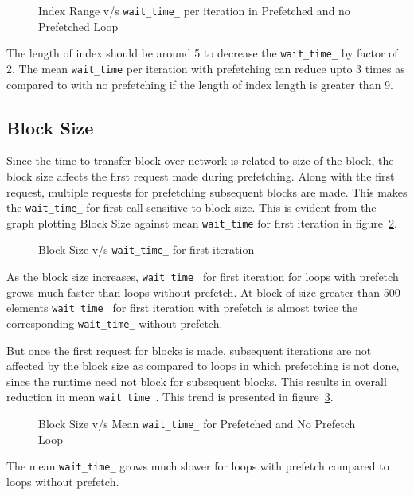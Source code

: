 \begin{figure}[h]
  
  \caption{Index Range v/s \texttt{wait\_time\_} per iteration in Prefetched and no Prefetched Loop}
  \label{fig:p_np_mean}
\end{figure}

The length of index should be around 5 to decrease the \texttt{wait\_time\_}
by factor of 2. The mean \texttt{wait\_time} per iteration with prefetching can
reduce upto 3 times as compared to with no prefetching if the length of index
length is greater than 9.

\subsection{Block Size}
Since the time to transfer block over network is related to size of the block, the
block size affects the first request made during prefetching. Along with the first
request, multiple requests for prefetching subsequent blocks are made. This makes
the \texttt{wait\_time\_} for first call sensitive to block size. This is evident
from the graph plotting Block Size against mean \texttt{wait\_time} for first
iteration in figure~\ref{fig:first_wait_time}.
\begin{figure}[h]
  
  \caption{Block Size v/s \texttt{wait\_time\_} for first iteration}
  \label{fig:first_wait_time}
\end{figure}

As the block size increases, \texttt{wait\_time\_} for first iteration for loops
with prefetch grows much faster than loops without prefetch. At block of size
greater than 500 elements \texttt{wait\_time\_} for first iteration with prefetch
is almost twice the corresponding \texttt{wait\_time\_} without prefetch.

But once the first request for blocks is made, subsequent iterations are not affected
by the block size as compared to loops in which prefetching is not done, since the
runtime need not block for subsequent blocks. This results in overall reduction
in mean \texttt{wait\_time\_}. This trend is presented in figure~\ref{fig:block_size_avg_wait_time}.
\begin{figure}[h]
  
  \caption{Block Size v/s Mean \texttt{wait\_time\_} for Prefetched and No Prefetch Loop}
  \label{fig:block_size_avg_wait_time}
\end{figure}

The mean \texttt{wait\_time\_} grows much slower for loops with prefetch compared
to loops without prefetch.

